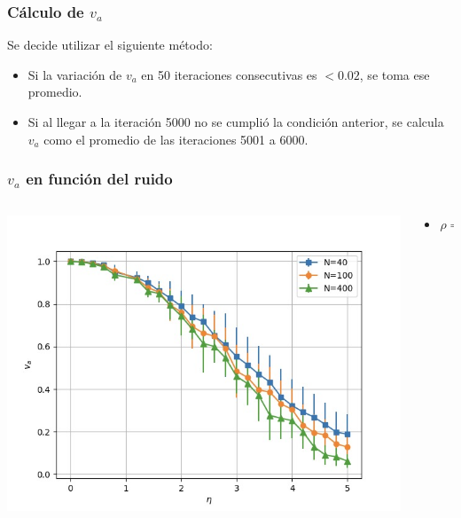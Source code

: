 \begin{frame}
\frametitle{Cálculo de \(v_a\)}
Se decide utilizar el siguiente método:
 \begin{itemize}
        \item Si la variación de \(v_a\) en 50 iteraciones consecutivas es \(< 0.02\), se toma ese promedio.
        \item Si al llegar a la iteración 5000 no se cumplió la condición anterior, se calcula \(v_a\) como el promedio de las iteraciones 5001 a 6000.   
        \end{itemize}
\end{frame}
\begin{frame}
\frametitle{\(v_a\) en función del ruido}
\begin{columns}
    \begin{column}{0.6\textwidth}
      \begin{center}
        \includegraphics[width=\textwidth]{images/va-vs-ruido.jpeg} %
      \end{center}
    \end{column}
    \begin{column}{0.4\textwidth}
                \footnotesize
\begin{center}
            \begin{itemize}
        \item \(\rho = 4\)
        \end{itemize}
\end{center}
    \end{column}
\end{columns}
\end{frame}
